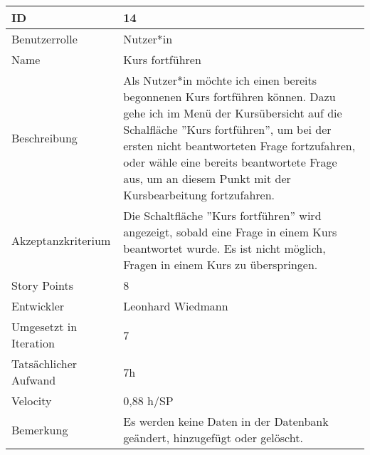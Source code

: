 \begin{tabularx}{\textwidth}{|p{}|X|}
	\hline
	ID & 14 \\
	\hline
	Benutzerrolle & Nutzer*in\\
	\hline
	Name & Kurs fortführen\\
	\hline
	Beschreibung & Als Nutzer*in möchte ich einen bereits begonnenen Kurs fortführen können. Dazu gehe ich im Menü der Kursübersicht auf die Schalfläche ''Kurs fortführen'', um bei der ersten nicht beantworteten Frage fortzufahren, oder wähle eine bereits beantwortete Frage aus, um an diesem Punkt mit der Kursbearbeitung fortzufahren. \\
	\hline
	Akzeptanzkriterium & Die Schaltfläche ''Kurs fortführen'' wird angezeigt, sobald eine Frage in einem Kurs beantwortet wurde. Es ist nicht möglich, Fragen in einem Kurs zu überspringen.\\
	\hline
	Story Points & 8\\
	\hline
	Entwickler & Leonhard Wiedmann\\
	\hline
	Umgesetzt in Iteration & 7 \\
	\hline
	Tatsächlicher Aufwand & 7h \\
	\hline
	Velocity & 0,88 h/SP \\
	\hline
	Bemerkung & Es werden keine Daten in der Datenbank geändert, hinzugefügt oder gelöscht.\\
	\hline
\end{tabularx}
\vspace{20pt}
